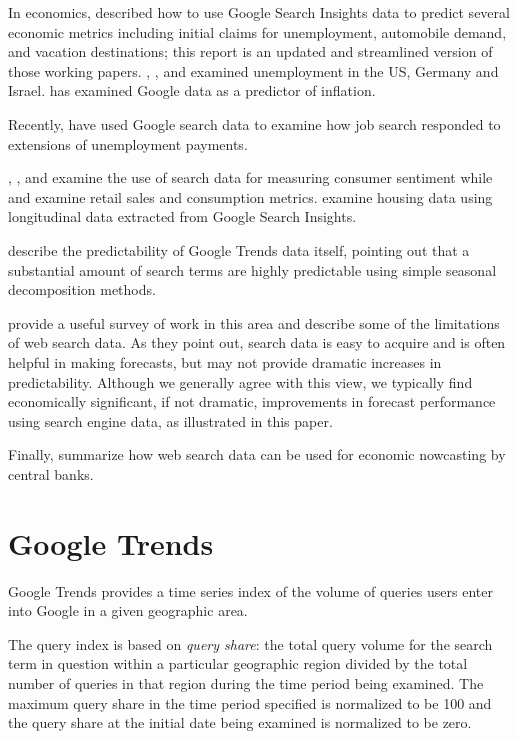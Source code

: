 \documentclass[12pt, oneside]{article}
\begin{document}
In economics, \citet{Choi09a, Choi09b} described how to use Google
Search Insights data to predict several economic metrics including
initial claims for unemployment, automobile demand, and vacation
destinations; this report is an updated and streamlined version of
those working papers.  \citet{Askitas10}, \citet{Damuri10},
and \citet{Suhoy09} examined unemployment in the US, Germany
and Israel.  \citet{Guzman11} has examined Google data as a predictor
of inflation.

Recently, \citet{Baker11} have used Google search data to examine how
job search responded to extensions of unemployment payments.

\citet{Radinsky09}, \citet{Huang10}, and \citet{Preis10} examine the
use of search data for measuring consumer sentiment while
\citet{Schmidt09} and \citet{Lindberg11} examine retail sales and
consumption metrics.  \citet{Wu10} examine housing data using
longitudinal data extracted from Google Search Insights.

\citet{Shimshoni10} describe the predictability of Google Trends data
itself, pointing out that a substantial amount of search terms are
highly predictable using simple seasonal decomposition methods.

\citet{Goel10} provide a useful survey of work in this area and
describe some of the limitations of web search data.  As they point
out, search data is easy to acquire and is often helpful in making
forecasts, but may not provide dramatic increases in
predictability.  Although we generally agree with this view, we
typically find economically significant, if not dramatic, improvements
in forecast performance using search engine data, as illustrated in
this paper.

Finally, \citet{BOE11} summarize how web search data can be used for
economic nowcasting by central banks.

\section{Google Trends\label{trends}}  

Google Trends provides a time series index of the volume of queries
users enter into Google in a given geographic area.

The query index is based on {\it query share}: the total query volume
for the search term in question within a particular geographic region
divided by the total number of queries in that region during the time
period being examined.  The maximum query share in the time period
specified is normalized to be 100 and the query share at the initial
date being examined is normalized to be zero.  
\end{document}
